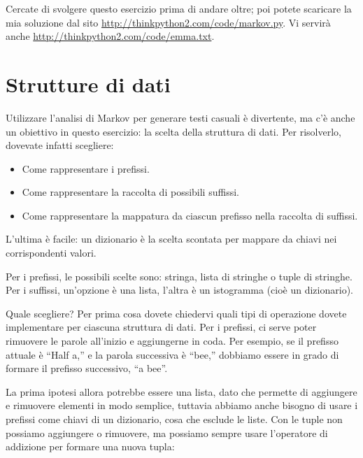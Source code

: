 \documentclass[10pt]{book}
\begin{document}
Cercate di svolgere questo esercizio prima di andare oltre; poi potete scaricare la mia soluzione dal sito \url{http://thinkpython2.com/code/markov.py}.  Vi servirà anche \url{http://thinkpython2.com/code/emma.txt}.


\section{Strutture di dati}

Utilizzare l'analisi di Markov per generare testi casuali è divertente, ma c'è anche un obiettivo in questo esercizio: la scelta della struttura di dati. Per risolverlo, dovevate infatti scegliere:

\begin{itemize}

\item Come rappresentare i prefissi.

\item Come rappresentare la raccolta di possibili suffissi.

\item Come rappresentare la mappatura da ciascun prefisso nella raccolta di suffissi.

\end{itemize}

L'ultima è facile: un dizionario è la scelta scontata per mappare da chiavi nei corrispondenti valori.

Per i prefissi, le possibili scelte sono: stringa, lista di stringhe o tuple di stringhe. Per i suffissi, un'opzione è una lista, l'altra è un istogramma (cioè un dizionario).

Quale scegliere? Per prima cosa dovete chiedervi quali tipi di operazione dovete implementare per ciascuna struttura di dati. Per i prefissi, ci serve poter rimuovere le parole all'inizio e aggiungerne in coda. Per esempio, se il prefisso attuale è ``Half a,'' e la parola successiva è ``bee,'' dobbiamo essere in grado di formare il prefisso successivo, ``a bee''.

La prima ipotesi allora potrebbe essere una lista, dato che permette di aggiungere e rimuovere elementi in modo semplice, tuttavia abbiamo anche bisogno di usare i prefissi come chiavi di un dizionario, cosa che esclude le liste. Con le tuple non possiamo aggiungere o rimuovere, ma possiamo sempre usare l'operatore di addizione per formare una nuova tupla:
\end{document}
